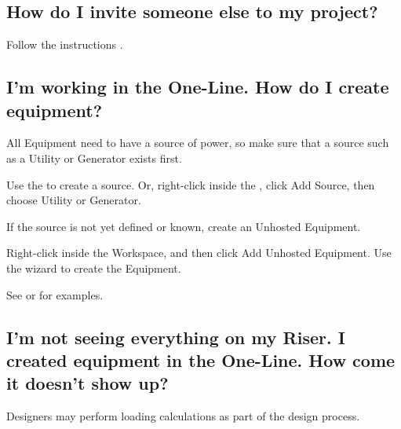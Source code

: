 \documentclass[letterpaper,10pt,english]{sphinxmanual}
\begin{document}
\subsection{How do I invite someone else to my project?}
\label{\detokenize{docs/faq:how-do-i-invite-someone-else-to-my-project}}\label{\detokenize{docs/faq:faq-invitations}}
Follow the instructions {\hyperref[\detokenize{docs/userguide/projectmanagement/accessibility/index-accessibility:accessibility}]{}}.


\subsection{I’m working in the One-Line.  How do I create equipment?}
\label{\detokenize{docs/faq:i-m-working-in-the-one-line-how-do-i-create-equipment}}
All Equipment need to have a source of power, so make sure that a source such as a Utility or Generator exists first.

Use the {\hyperref[\detokenize{docs/userguide/buildingelectricalmodel/one-line/index-one-line:one-line-adding-a-source}]{}} to create a source.  Or, right-click inside the {\hyperref[\detokenize{docs/userguide/buildingelectricalmodel/one-line/index-one-line::doc}]{}}, click Add Source, then choose Utility or Generator.

If the source is not yet defined or known, create an Unhosted Equipment.

Right-click inside the Workspace, and then click Add Unhosted Equipment.  Use the wizard to create the Equipment.

See {\hyperref[\detokenize{docs/userguide/buildingelectricalmodel/one-line/index-one-line:one-line-adding-a-source}]{}} or {\hyperref[\detokenize{docs/userguide/buildingelectricalmodel/one-line/index-one-line:one-line-adding-equipment}]{}} for examples.


\subsection{I’m not seeing everything on my Riser.  I created equipment in the One-Line.  How come it doesn’t show up?}
\label{\detokenize{docs/faq:i-m-not-seeing-everything-on-my-riser-i-created-equipment-in-the-one-line-how-come-it-doesn-t-show-up}}
Designers may perform loading calculations as part of the design process.
\end{document}
